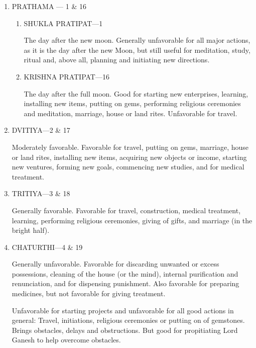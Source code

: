 \begin{enumerate}

\item[ ] PRATHAMA — 1 \& 16

\begin{enumerate}
\item[ ] SHUKLA PRATIPAT—1

The day after the new moon. Generally unfavorable for all major actions, as it is the day after the new Moon, but still useful for meditation, study, ritual and, above all, planning and initiating new directions.

 

\item[ ] KRISHNA PRATIPAT—16

The day after the full moon. Good for starting new enterprises, learning, installing new items, putting on gems, performing religious ceremonies and meditation, marriage, house or land rites. Unfavorable for travel.

 \end{enumerate}

\item[ ] DVITIYA—2 \& 17

Moderately favorable. Favorable for travel, putting on gems, marriage, house or land rites, installing new items, acquiring new objects or income, starting new ventures, forming new goals, commencing new studies, and for medical treatment.

 

\item[ ] TRITIYA—3 \& 18

Generally favorable. Favorable for travel, construction, medical treatment, learning, performing religious ceremonies, giving of gifts, and marriage (in the bright half).

 

\item[ ] CHATURTHI—4 \& 19

Generally unfavorable. Favorable for discarding unwanted or excess possessions, cleaning of the house (or the mind), internal purification and renunciation, and for dispensing punishment. Also favorable for preparing medicines, but not favorable for giving treatment.

Unfavorable for starting projects and unfavorable for all good actions in general: Travel, initiations, religious ceremonies or putting on of gemstones. Brings obstacles, delays and obstructions. But good for propitiating Lord Ganesh to help overcome obstacles.


\end{enumerate}

